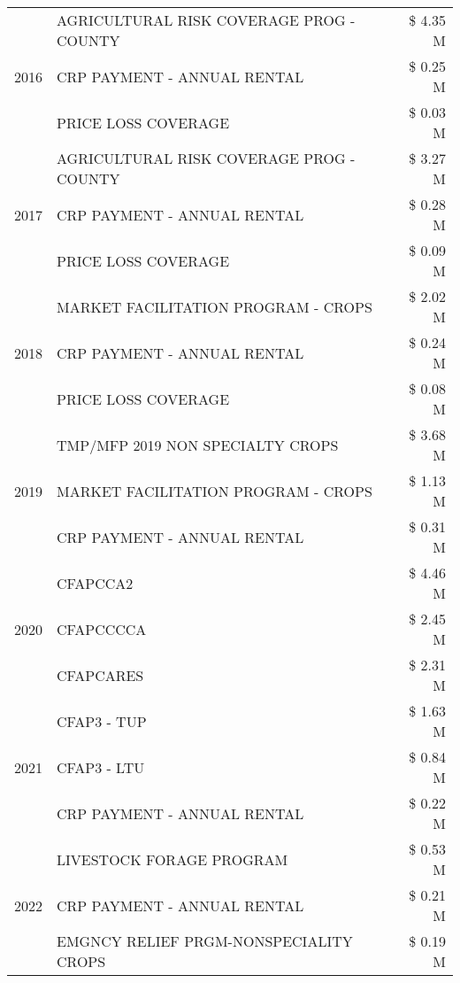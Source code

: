\begin{tabular}{llr}
\cline{1-3}
\multirow[t]{3}{*}{2016} & AGRICULTURAL RISK COVERAGE PROG - COUNTY & \$ 4.35 M \\
 & CRP PAYMENT - ANNUAL RENTAL & \$ 0.25 M \\
 & PRICE LOSS COVERAGE & \$ 0.03 M \\
\cline{1-3}
\multirow[t]{3}{*}{2017} & AGRICULTURAL RISK COVERAGE PROG - COUNTY & \$ 3.27 M \\
 & CRP PAYMENT - ANNUAL RENTAL & \$ 0.28 M \\
 & PRICE LOSS COVERAGE & \$ 0.09 M \\
\cline{1-3}
\multirow[t]{3}{*}{2018} & MARKET FACILITATION PROGRAM - CROPS & \$ 2.02 M \\
 & CRP PAYMENT - ANNUAL RENTAL & \$ 0.24 M \\
 & PRICE LOSS COVERAGE & \$ 0.08 M \\
\cline{1-3}
\multirow[t]{3}{*}{2019} & TMP/MFP 2019 NON SPECIALTY CROPS & \$ 3.68 M \\
 & MARKET FACILITATION PROGRAM - CROPS & \$ 1.13 M \\
 & CRP PAYMENT - ANNUAL RENTAL & \$ 0.31 M \\
\cline{1-3}
\multirow[t]{3}{*}{2020} & CFAPCCA2 & \$ 4.46 M \\
 & CFAPCCCCA & \$ 2.45 M \\
 & CFAPCARES & \$ 2.31 M \\
\cline{1-3}
\multirow[t]{3}{*}{2021} & CFAP3 - TUP & \$ 1.63 M \\
 & CFAP3 - LTU & \$ 0.84 M \\
 & CRP PAYMENT - ANNUAL RENTAL & \$ 0.22 M \\
\cline{1-3}
\multirow[t]{3}{*}{2022} & LIVESTOCK FORAGE PROGRAM & \$ 0.53 M \\
 & CRP PAYMENT - ANNUAL RENTAL & \$ 0.21 M \\
 & EMGNCY RELIEF PRGM-NONSPECIALITY CROPS & \$ 0.19 M \\
\cline{1-3}
\bottomrule
\end{tabular}
